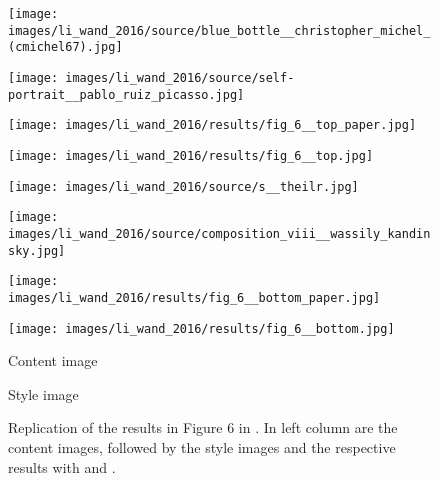 \begin{figure}[H]
	\centering
	\begin{minipage}[t]{0.23\textwidth}
		\centering
		\texttt{[image: images/li\_wand\_2016/source/blue\_bottle\_\_christopher\_michel\_(cmichel67).jpg]}
	\end{minipage}
	\hfill%
	\begin{minipage}[t]{0.23\textwidth}
		\centering
		\texttt{[image: images/li\_wand\_2016/source/self-portrait\_\_pablo\_ruiz\_picasso.jpg]}
	\end{minipage}
	\hfill%
	\begin{minipage}[t]{0.23\textwidth}
		\centering
		\texttt{[image: images/li\_wand\_2016/results/fig\_6\_\_top\_paper.jpg]}
	\end{minipage}
	\hfill%
	\begin{minipage}[t]{0.23\textwidth}
		\centering
		\texttt{[image: images/li\_wand\_2016/results/fig\_6\_\_top.jpg]}
	\end{minipage}
	\hfill%
	\begin{minipage}[t]{0.23\textwidth}
		\centering
		\texttt{[image: images/li\_wand\_2016/source/s\_\_theilr.jpg]}
	\end{minipage}
	\hfill%
	\begin{minipage}[t]{0.23\textwidth}
		\centering
		\texttt{[image: images/li\_wand\_2016/source/composition\_viii\_\_wassily\_kandinsky.jpg]}
	\end{minipage}
	\hfill%
	\begin{minipage}[t]{0.23\textwidth}
		\centering
		\texttt{[image: images/li\_wand\_2016/results/fig\_6\_\_bottom\_paper.jpg]}
	\end{minipage}
	\hfill%
	\begin{minipage}[t]{0.23\textwidth}
		\centering
		\texttt{[image: images/li\_wand\_2016/results/fig\_6\_\_bottom.jpg]}
	\end{minipage}
	\hfill%
	\begin{minipage}[t]{0.23\textwidth}
	\centering
	Content image
	\end{minipage}
	\hfill%
	\begin{minipage}[t]{0.23\textwidth}
		\centering
		Style image
	\end{minipage}
	\hfill%
	\begin{minipage}[t]{0.23\textwidth}
		\centering
		\paper{}
	\end{minipage}
	\hfill%
	\begin{minipage}[t]{0.23\textwidth}
		\centering
		\implementation{}
	\end{minipage}
	\caption{Replication of the results in Figure 6 in \cite{LW2016}. In left column are the content images, followed by the style images and the respective results with \paper{} and \implementation{}.}
	\label{fig:LW2016_fig6}
\end{figure}

